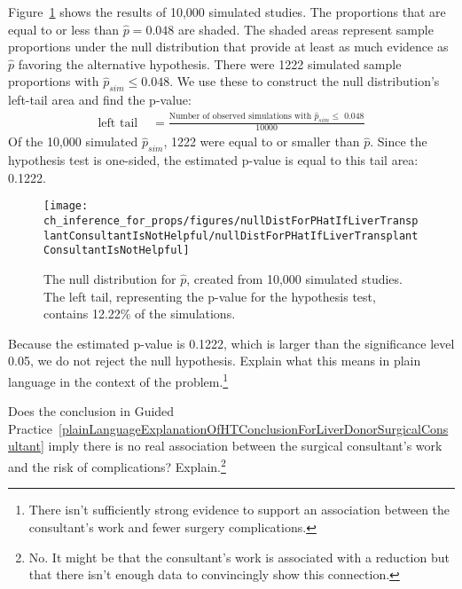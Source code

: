 Figure~\ref{nullDistForPHatIfLiverTransplantConsultantIsNotHelpful} shows the results of 10,000 simulated studies. The proportions that are equal to or less than $\hat{p}=0.048$ are shaded. The shaded areas represent sample proportions under the null distribution that provide at least as much evidence as $\hat{p}$ favoring the alternative hypothesis. There were 1222 simulated sample proportions with $\hat{p}_{sim} \leq 0.048$. We use these to construct the null distribution's left-tail area and find the p-value:
\begin{align}
\text{left tail }\label{estOfPValueBasedOnSimulatedNullForSingleProportion}
	&= \frac{\text{Number of observed simulations with }\hat{p}_{sim}\leq\text{ 0.048}}{10000}
\end{align}
Of the 10,000 simulated $\hat{p}_{sim}$, 1222 were equal to or smaller than $\hat{p}$. Since the hypothesis test is one-sided, the estimated p-value is equal to this tail area: 0.1222.
\begin{figure}
\centering
\texttt{[image: ch\_inference\_for\_props/figures/nullDistForPHatIfLiverTransplantConsultantIsNotHelpful/nullDistForPHatIfLiverTransplantConsultantIsNotHelpful]}
\caption{The null distribution for $\hat{p}$, created from 10,000 simulated studies. The left tail, representing the p-value for the hypothesis test, contains 12.22\% of the simulations.}
\label{nullDistForPHatIfLiverTransplantConsultantIsNotHelpful}
\end{figure}

\begin{exercise} \label{plainLanguageExplanationOfHTConclusionForLiverDonorSurgicalConsultant}
Because the estimated p-value is 0.1222, which is larger than the significance level 0.05, we do not reject the null hypothesis. Explain what this means in plain language in the context of the problem.\footnote{There isn't sufficiently strong evidence to support an association between the consultant's work and fewer surgery complications.}
\end{exercise}

\begin{exercise}
Does the conclusion in Guided Practice~\ref{plainLanguageExplanationOfHTConclusionForLiverDonorSurgicalConsultant} imply there is no real association between the surgical consultant's work and the risk of complications? Explain.\footnote{No. It might be that the consultant's work is associated with a reduction but that there isn't enough data to convincingly show this connection.}
\end{exercise}


